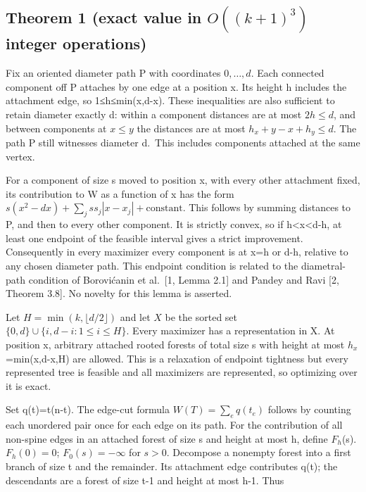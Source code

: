 \documentclass[
  10pt,
  a4paper,
]{article}
\begin{document}
\subsection{\texorpdfstring{Theorem 1 (exact value in \(O((k+1)^3)\)
integer
operations)}{Theorem 1 (exact value in O((k+1)\^{}3) integer operations)}}\label{theorem-1-exact-value-in-ok13-integer-operations}

Fix an oriented diameter path P with coordinates \(0,\ldots,d\). Each
connected component off P attaches by one edge at a position x. Its
height h includes the attachment edge, so 1≤h≤min(x,d-x). These
inequalities are also sufficient to retain diameter exactly d: within a
component distances are at most \(2h\le d\), and between components at
\(x\le y\) the distances are at most \(h_x+y-x+h_y\le d\). The path P
still witnesses diameter d.~This includes components attached at the
same vertex.

For a component of size s moved to position x, with every other
attachment fixed, its contribution to W as a function of x has the form
\(s(x^2-dx)+\sum_j ss_j|x-x_j|+\text{constant}\). This follows by
summing distances to P, and then to every other component. It is
strictly convex, so if h\textless x\textless d-h, at least one endpoint
of the feasible interval gives a strict improvement. Consequently in
every maximizer every component is at x=h or d-h, relative to any chosen
diameter path. This endpoint condition is related to the diametral-path
condition of Borovićanin et al.~{[}1, Lemma 2.1{]} and Pandey and Ravi
{[}2, Theorem 3.8{]}. No novelty for this lemma is asserted.

Let \(H=\min(k,\lfloor d/2\rfloor)\) and let \(X\) be the sorted set
\(\{0,d\}\cup\{i,d-i:1\le i\le H\}\). Every maximizer has a
representation in X. At position x, arbitrary attached rooted forests of
total size s with height at most \(h_x\)=min(x,d-x,H) are allowed. This
is a relaxation of endpoint tightness but every represented tree is
feasible and all maximizers are represented, so optimizing over it is
exact.

Set q(t)=t(n-t). The edge-cut formula \(W(T)=\sum_e q(t_e)\) follows by
counting each unordered pair once for each edge on its path. For the
contribution of all non-spine edges in an attached forest of size s and
height at most h, define \(F_h\)(s). \(F_h(0)=0\); \(F_0(s)=-\infty\)
for \(s>0\). Decompose a nonempty forest into a first branch of size t
and the remainder. Its attachment edge contributes q(t); the descendants
are a forest of size t-1 and height at most h-1. Thus
\end{document}
